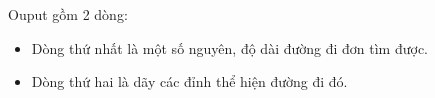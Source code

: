 Ouput gồm 2 dòng:
\begin{itemize}
	\item Dòng thứ nhất là một số nguyên, độ dài đường đi đơn tìm được. 
	\item Dòng thứ hai là dãy các đỉnh thể hiện đường đi đó. 
\end{itemize}
